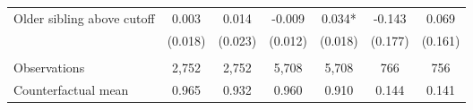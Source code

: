 {{\begin{tabular}{lcccccc}
Older sibling above cutoff&       0.003   &       0.014   &      -0.009   &       0.034*  &      -0.143   &       0.069   \\
                    &     (0.018)   &     (0.023)   &     (0.012)   &     (0.018)   &     (0.177)   &     (0.161)   \\
                    &               &               &               &               &               &               \\
Observations        &       2,752   &       2,752   &       5,708   &       5,708   &         766   &         756   \\
Counterfactual mean &       0.965   &       0.932   &       0.960   &       0.910   &       0.144   &       0.141   \\
 

\bottomrule
\end{tabular}
}
}
